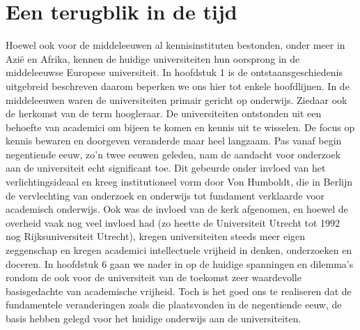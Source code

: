 \documentclass[empirical, authordate, ]{new-jote-article}
\begin{document}
	\section{Een terugblik in de tijd}



	Hoewel ook voor de middeleeuwen al kennisinstituten bestonden, onder meer in Azië en Afrika, kennen de huidige universiteiten hun oorsprong in de middeleeuwse Europese universiteit. In hoofdstuk 1 is de ontstaansgeschiedenis uitgebreid beschreven daarom beperken we ons hier tot enkele hoofdlijnen. In de middeleeuwen waren de universiteiten primair gericht op onderwijs. Ziedaar ook de herkomst van de term hoogleraar. De universiteiten ontstonden uit een behoefte van academici om bijeen te komen en kennis uit te wisselen. De focus op kennis bewaren en doorgeven veranderde maar heel langzaam. Pas vanaf begin negentiende eeuw, zo'n twee eeuwen geleden, nam de aandacht voor onderzoek aan de universiteit echt significant toe. Dit gebeurde onder invloed van het verlichtingsideaal en kreeg institutioneel vorm door Von Humboldt, die in Berlijn de vervlechting van onderzoek en onderwijs tot fundament verklaarde voor academisch onderwijs. Ook was de invloed van de kerk afgenomen, en hoewel de overheid vaak nog veel invloed had (zo heette de Universiteit Utrecht tot 1992 nog Rijksuniversiteit Utrecht), kregen universiteiten steeds meer eigen zeggenschap en kregen academici intellectuele vrijheid in denken, onderzoeken en doceren. In hoofdstuk 6 gaan we nader in op de huidige spanningen en dilemma's rondom de ook voor de universiteit van de toekomst zeer waardevolle basisgedachte van academische vrijheid. Toch is het goed ons te realiseren dat de fundamentele veranderingen zoals die plaatsvonden in de negentiende eeuw, de basis hebben gelegd voor het huidige onderwijs aan de universiteiten.
\end{document}
